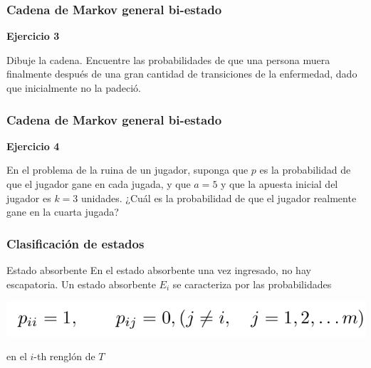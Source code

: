 \documentclass[spanish]{beamer}
\begin{document}
\begin{frame}
\frametitle{Cadena de Markov general bi-estado}
\textbf{Ejercicio 3}


Dibuje la cadena. Encuentre las probabilidades de que una persona muera finalmente después de una gran cantidad de transiciones de la enfermedad, dado que inicialmente no la padeció.

\end{frame}

\begin{frame}
\frametitle{Cadena de Markov general bi-estado}
\textbf{Ejercicio 4}


En el problema de la ruina de un jugador, suponga que $p$ es la probabilidad de que el jugador gane en cada jugada, y que $a = 5$ y que la apuesta inicial del jugador es $k = 3$ unidades. ¿Cuál es la probabilidad de que el jugador realmente gane en la cuarta jugada?

\end{frame}

\begin{frame}
\frametitle{Clasificación de estados}
\begin{block}{Estado absorbente}
En el estado absorbente una vez ingresado, no hay escapatoria. Un estado absorbente $E_i$ se caracteriza por las probabilidades

\begin{center}
\includegraphics[scale=0.4]{im28}
\end{center}
en el $i$-th renglón de  $T$
\end{block}

\end{frame}
\end{document}
